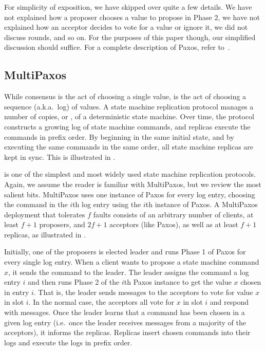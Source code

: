 {}

For simplicity of exposition, we have skipped over quite a few details. We have
not explained how a proposer chooses a value to propose in Phase 2, we have not
explained how an acceptor decides to vote for a value or ignore it, we did not
discuss rounds, and so on. For the purposes of this paper though, our
simplified discussion should suffice. For a complete description of Paxos,
refer to~\cite{lamport2001paxos}.

\subsection{MultiPaxos}
While consensus is the act of choosing a single value,  is the act of choosing a sequence (a.k.a.\ log) of values. A state
machine replication protocol manages a number of copies, or ,
of a deterministic state machine. Over time, the protocol constructs a growing
log of state machine commands, and replicas execute the commands in prefix
order.  By beginning in the same initial state, and by executing the same
commands in the same order, all state machine replicas are kept in sync. This
is illustrated in .

{}

 is one of the simplest and most widely used state machine
replication protocols. Again, we assume the reader is familiar with MultiPaxos,
but we review the most salient bits.
%
MultiPaxos uses one instance of Paxos for every log entry, choosing the command
in the $i$th log entry using the $i$th instance of Paxos.
%
A MultiPaxos deployment that tolerates $f$ faults consists of an arbitrary
number of clients, at least $f+1$ proposers, and $2f+1$ acceptors (like Paxos),
as well as at least $f+1$ replicas, as illustrated in
.

{}

Initially, one of the proposers is elected leader and runs Phase 1 of Paxos for
every single log entry. When a client wants to propose a state machine command
$x$, it sends the command to the leader. The leader assigns the command a log
entry $i$ and then runs Phase 2 of the $i$th Paxos instance to get the value
$x$ chosen in entry $i$.  That is, the leader sends 
messages to the acceptors to vote for value $x$ in slot $i$. In the normal
case, the acceptors all vote for $x$ in slot $i$ and respond with
 messages. Once the leader learns that a command has been
chosen in a given log entry (i.e.\ once the leader receives 
messages from a majority of the acceptors), it informs the replicas. Replicas
insert chosen commands into their logs and execute the logs in prefix order.


